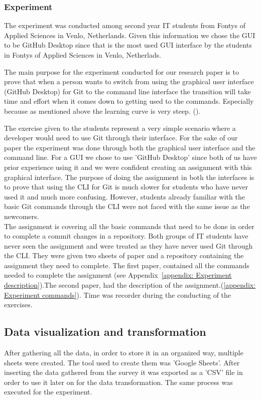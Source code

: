 \documentclass[]{report}
\begin{document}
	\subsubsection{Experiment}
	
	The experiment was conducted among second year IT students from Fontys of Applied Sciences in Venlo, Netherlands. Given this information we chose the GUI to be GitHub Desktop since that is the most used GUI interface by the students in Fontys of Applied Sciences in Venlo, Netherlads.
	
	
	The main purpose for the experiment conducted for our research paper is to prove that when a person wants to switch from using the graphical user interface (GitHub Desktop) for Git to the command line interface the transition will take time and effort when it comes down to getting used to the commands. Especially because as mentioned above the learning curve is very steep. (\cite{justin_c_bagley_reasons_nodate}).

	The exercise given to the students represent a very simple scenario where a developer would need to use Git through their interface. For the sake of our paper the experiment was done through both the graphical user interface and the command line. For a GUI we chose to use 'GitHub Desktop' since both of us have prior experience using it and we were confident creating an assignment with this graphical interface. The purpose of doing the assignment in both the interfaces is to prove that using the CLI for Git is much slower for students who have never used it and much more confusing. However, students already familiar with the basic Git commands through the CLI were not faced with the same issue as the newcomers.\\
	
	The assignment is covering all the basic commands that need to be done in order to complete a commit changes in a repository. Both groups of IT students have never seen the assignment and were treated as they have never used Git through the CLI. They were given two sheets of paper and a repository containing the assignment they need to complete. The first paper, contained all the commands needed to complete the assignment (see Appendix\ \ref{appendix: Experiment description}).The second paper, had the description of the assignment.(\ref{appendix: Experiment commands}). Time was recorder during the conducting of the exercises.
	
	
	\subsection{Data visualization and transformation}
	After gathering all the data, in order to store it in an organized way, multiple sheets were created. The tool used to create them was 'Google Sheets'. After inserting the data gathered from the survey it was exported as a 'CSV' file in order to use it later on for the data transformation. The same process was executed for the experiment. \\
	
\end{document}
